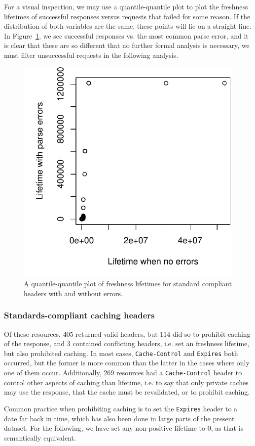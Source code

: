 \documentclass{llncs}
\newcommand{\httph}[1]{\texttt{#1}}
\begin{document}
For a visual inspection, we may use a quantile-quantile plot to plot
the freshness lifetimes of successful responses versus requests that
failed for some reason. If the distribution of both variables are the
same, these points will lie on a straight line. In
Figure~\ref{fig:errorsqq}, we see successful responses vs. the most
common parse error, and it is clear that these are so different that
no further formal analysis is necessary, we must filter unsuccessful
requests in the following analysis.


\begin{figure}[ht!]
  \centerline{%
    \includegraphics[width=.5\textwidth]{errorsqq.pdf}}
  \caption{A quantile-quantile plot of freshness lifetimes for
    standard compliant headers with and without errors.}
  \label{fig:errorsqq}
\end{figure}


\subsubsection{Standards-compliant caching headers}

Of these resources, 405 returned valid headers, but 114 did so to
prohibit caching of the response, and 3 contained conflicting
headers, i.e. set an freshness lifetime, but also prohibited
caching. In most cases, \httph{Cache-Control} and \httph{Expires} both
occurred, but the former is more common than the latter in the cases
where only one of them occur.  Additionally, 269 resources had a
\httph{Cache-Control} header to control other aspects of caching than
lifetime, i.e. to say that only private caches may use the response,
that the cache must be revalidated, or to prohibit caching.

Common practice when prohibiting caching is to set the \httph{Expires}
header to a date far back in time, which has also been done in large
parts of the present dataset. For the following, we have set any
non-positive lifetime to 0, as that is semantically equivalent.
\end{document}
